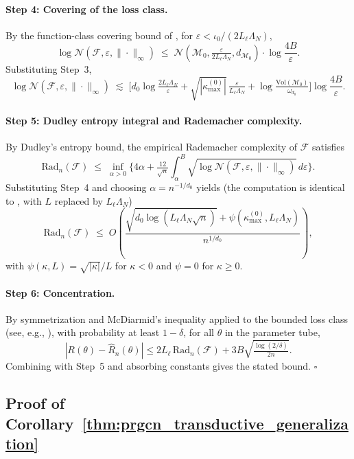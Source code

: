\documentclass[letterpaper]{article}
\begin{document}
\paragraph{Step 4: Covering of the loss class.}
By the function-class covering bound of
\cite[Theorem~3.2]{sarkar2025learning}, for
$\varepsilon < \iota_0/(2L_\ell\Lambda_N)$,
\[
\log \mathcal N(\mathcal F, \varepsilon, \|\cdot\|_\infty)
\;\le\;
\mathcal N\!\left(\mathcal M_0,\tfrac{\varepsilon}{2L_\ell\Lambda_N},d_{\mathcal M_0}\right)
\cdot \log\!\frac{4B}{\varepsilon}.
\]
Substituting Step~3,
\[
\log \mathcal N(\mathcal F, \varepsilon, \|\cdot\|_\infty)
\;\lesssim\;
\Big[
d_0 \log\!\tfrac{2L_\ell\Lambda_N}{\varepsilon}
+ \sqrt{|\kappa_{\max}^{(0)}|}\,\tfrac{\varepsilon}{L_\ell\Lambda_N}
+ \log\!\tfrac{\mathrm{Vol}(\mathcal M_0)}{\omega_{d_0}}
\Big]\log\!\frac{4B}{\varepsilon}.
\]

\paragraph{Step 5: Dudley entropy integral and Rademacher complexity.}
By Dudley's entropy bound, the empirical Rademacher complexity of
$\mathcal F$ satisfies
\[
\mathrm{Rad}_n(\mathcal F)
\;\le\;
\inf_{\alpha>0}
\Big\{4\alpha + \tfrac{12}{\sqrt n}\int_\alpha^B
\sqrt{\log\mathcal N(\mathcal F,\varepsilon,\|\cdot\|_\infty)}\,d\varepsilon\Big\}.
\]
Substituting Step~4 and choosing $\alpha = n^{-1/d_0}$ yields (the
computation is identical to \cite[Theorem~3.3, Steps~3--5]{sarkar2025learning},
with $L$ replaced by $L_\ell\Lambda_N$)
\[
\mathrm{Rad}_n(\mathcal F)
\;\le\;
O\!\left(
\frac{\sqrt{d_0 \log(L_\ell\Lambda_N\sqrt n)}+\psi(\kappa_{\max}^{(0)}, L_\ell\Lambda_N)}{n^{1/d_0}}
\right),
\]
with $\psi(\kappa,L)=\sqrt{|\kappa|}/L$ for $\kappa<0$ and $\psi=0$ for
$\kappa\ge 0$.

\paragraph{Step 6: Concentration.}
By symmetrization and McDiarmid's inequality applied to the bounded loss
class (see, e.g., \cite[Corollary~3.4]{sarkar2025learning}), with
probability at least $1-\delta$, for all $\theta$ in the parameter tube,
\[
|R(\theta)-\hat R_n(\theta)|
\le 2L_\ell\,\mathrm{Rad}_n(\mathcal F)
+ 3B\sqrt{\tfrac{\log(2/\delta)}{2n}}.
\]
Combining with Step~5 and absorbing constants gives the stated bound.
$\square$

\subsection{Proof of Corollary~\ref{thm:prgcn_transductive_generalization}}
\label{sec:proof-gen}
\end{document}

